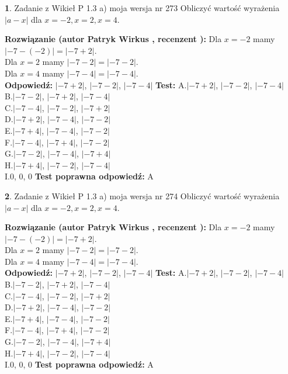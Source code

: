 \documentclass[12pt, a4paper]{article}
\theoremstyle{definition} %
\newtheorem{zad}{}
\newcommand{\zadStart}[1]{\begin{zad}#1\newline}
\newcommand{\zadStop}{\end{zad}}
\newcommand{\rozwStart}[2]{\noindent \textbf{Rozwiązanie (autor #1 , recenzent #2): }\newline}
\newcommand{\rozwStop}{\newline}
\newcommand{\odpStart}{\noindent \textbf{Odpowiedź:}\newline}
\newcommand{\odpStop}{\newline}
\newcommand{\testStart}{\noindent \textbf{Test:}\newline}
\newcommand{\testStop}{\newline}
\newcommand{\kluczStart}{\noindent \textbf{Test poprawna odpowiedź:}\newline}
\newcommand{\kluczStop}{\newline}
\begin{document}
\zadStart{Zadanie z Wikieł P 1.3 a) moja wersja nr 273}
Obliczyć wartość wyrażenia $|a - x|$ dla $x=-2,x=2,x=4$.
\zadStop
\rozwStart{Patryk Wirkus}{}
Dla $x = -2$ mamy $|-7 - (-2)| = |-7 + 2|$.\\
Dla $x = 2$ mamy $|-7 - 2| = |-7 - 2|$.\\
Dla $x = 4$ mamy $|-7 - 4| = |-7 - 4|$.\\
\rozwStop
\odpStart
$|-7 + 2|$, $|-7 - 2|$, $|-7 - 4|$
\odpStop
\testStart
A.$|-7 + 2|$, $|-7 - 2|$, $|-7 - 4|$\\
B.$|-7 - 2|$, $|-7 + 2|$, $|-7 - 4|$\\
C.$|-7 - 4|$, $|-7 - 2|$, $|-7 + 2|$\\
D.$|-7 + 2|$, $|-7 - 4|$, $|-7 - 2|$\\
E.$|-7 + 4|$, $|-7 - 4|$, $|-7 - 2|$\\
F.$|-7 - 4|$, $|-7 + 4|$, $|-7 - 2|$\\
G.$|-7 - 2|$, $|-7 - 4|$, $|-7 + 4|$\\
H.$|-7 + 4|$, $|-7 - 2|$, $|-7 - 4|$\\
I.$0$, $0$, $0$
\testStop
\kluczStart
A
\kluczStop



\zadStart{Zadanie z Wikieł P 1.3 a) moja wersja nr 274}
Obliczyć wartość wyrażenia $|a - x|$ dla $x=-2,x=2,x=4$.
\zadStop
\rozwStart{Patryk Wirkus}{}
Dla $x = -2$ mamy $|-7 - (-2)| = |-7 + 2|$.\\
Dla $x = 2$ mamy $|-7 - 2| = |-7 - 2|$.\\
Dla $x = 4$ mamy $|-7 - 4| = |-7 - 4|$.\\
\rozwStop
\odpStart
$|-7 + 2|$, $|-7 - 2|$, $|-7 - 4|$
\odpStop
\testStart
A.$|-7 + 2|$, $|-7 - 2|$, $|-7 - 4|$\\
B.$|-7 - 2|$, $|-7 + 2|$, $|-7 - 4|$\\
C.$|-7 - 4|$, $|-7 - 2|$, $|-7 + 2|$\\
D.$|-7 + 2|$, $|-7 - 4|$, $|-7 - 2|$\\
E.$|-7 + 4|$, $|-7 - 4|$, $|-7 - 2|$\\
F.$|-7 - 4|$, $|-7 + 4|$, $|-7 - 2|$\\
G.$|-7 - 2|$, $|-7 - 4|$, $|-7 + 4|$\\
H.$|-7 + 4|$, $|-7 - 2|$, $|-7 - 4|$\\
I.$0$, $0$, $0$
\testStop
\kluczStart
A
\kluczStop
\end{document}
